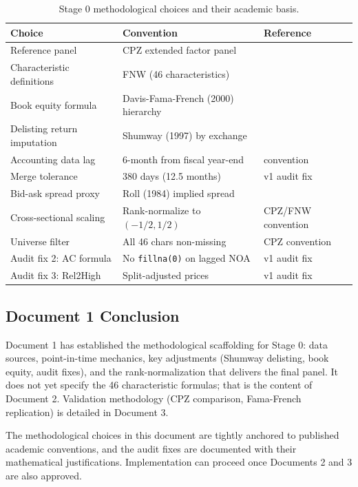 \begin{table}[!ht]
\centering
\small
\begin{tabular}{p{5cm}p{5cm}p{4cm}}
\toprule
\textbf{Choice} & \textbf{Convention} & \textbf{Reference} \\
\midrule
Reference panel & CPZ extended factor panel & \cite{ChenPelgerZhu2024} \\
Characteristic definitions & FNW (46 characteristics) & \cite{FreybergerNeuhierlWeber2020} \\
Book equity formula & Davis-Fama-French (2000) hierarchy & \cite{DavisFamaFrench2000} \\
Delisting return imputation & Shumway (1997) by exchange & \cite{Shumway1997} \\
Accounting data lag & 6-month from fiscal year-end & \cite{FamaFrench1993} convention \\
Merge tolerance & 380 days (12.5 months) & v1 audit fix \\
Bid-ask spread proxy & Roll (1984) implied spread & \cite{Roll1984} \\
Cross-sectional scaling & Rank-normalize to $(-1/2, 1/2)$ & CPZ/FNW convention \\
Universe filter & All 46 chars non-missing & CPZ convention \\
Audit fix 2: AC formula & No \texttt{fillna(0)} on lagged NOA & v1 audit fix \\
Audit fix 3: Rel2High & Split-adjusted prices & v1 audit fix \\
\bottomrule
\end{tabular}
\caption{Stage 0 methodological choices and their academic basis.}
\label{tab:stage0-rationale}
\end{table}

\subsection{Document 1 Conclusion}

Document 1 has established the methodological scaffolding for Stage 0:
data sources, point-in-time mechanics, key adjustments (Shumway
delisting, book equity, audit fixes), and the rank-normalization
that delivers the final panel. It does not yet specify the 46
characteristic formulas; that is the content of Document 2. Validation
methodology (CPZ comparison, Fama-French replication) is detailed in
Document 3.

The methodological choices in this document are tightly anchored to
published academic conventions, and the audit fixes are documented with
their mathematical justifications. Implementation can proceed once
Documents 2 and 3 are also approved.
